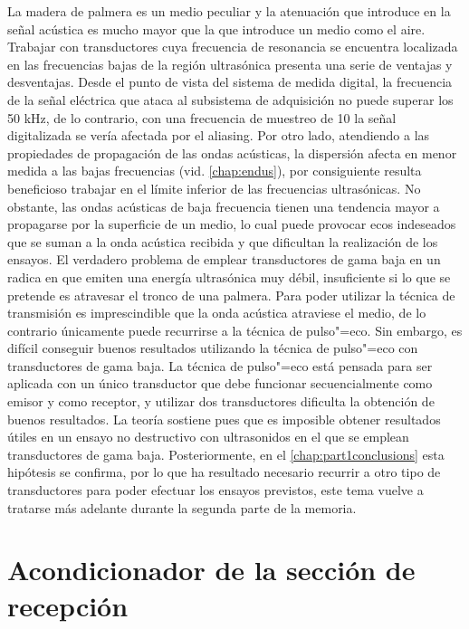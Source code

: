 La madera de palmera es un medio peculiar y la atenuación que introduce en
la señal acústica es mucho mayor que la que introduce un medio como el
aire. Trabajar con transductores cuya frecuencia de resonancia se encuentra
localizada en las frecuencias bajas de la región ultrasónica presenta una
serie de ventajas y desventajas. Desde el punto de vista del sistema de
medida digital, la frecuencia de la señal eléctrica que ataca al subsistema
de adquisición no puede superar los 50 kHz, de lo contrario, con una
frecuencia de muestreo de 10 \kms{} la señal digitalizada se vería afectada
por el aliasing. Por otro lado, atendiendo a las propiedades de propagación
de las ondas acústicas, la dispersión afecta en menor medida a las bajas
frecuencias (vid. \cref{chap:endus}), por consiguiente resulta beneficioso
trabajar en el límite inferior de las frecuencias ultrasónicas. No
obstante, las ondas acústicas de baja frecuencia tienen una tendencia mayor
a propagarse por la superficie de un medio, lo cual puede provocar ecos
indeseados que se suman a la onda acústica recibida y que dificultan la
realización de los ensayos. El verdadero problema de emplear transductores
de gama baja en un  radica en que emiten una energía ultrasónica
muy débil, insuficiente si lo que se pretende es atravesar el tronco de una
palmera. Para poder utilizar la técnica de transmisión es imprescindible
que la onda acústica atraviese el medio, de lo contrario únicamente puede
recurrirse a la técnica de pulso"=eco. Sin embargo, es difícil conseguir
buenos resultados utilizando la técnica de pulso"=eco con transductores de
gama baja. La técnica de pulso"=eco está pensada para ser aplicada con un
único transductor que debe funcionar secuencialmente como emisor y como
receptor, y utilizar dos transductores dificulta la obtención de buenos
resultados. La teoría sostiene pues que es imposible obtener resultados
útiles en un ensayo no destructivo con ultrasonidos en el que se emplean
transductores de gama baja. Posteriormente, en el
\cref{chap:part1conclusions} esta hipótesis se confirma, por lo que ha
resultado necesario recurrir a otro tipo de transductores para poder
efectuar los ensayos previstos, este tema vuelve a tratarse más adelante
durante la segunda parte de la memoria.


\section{Acondicionador de la sección de recepción}\label{sec:rxco}

